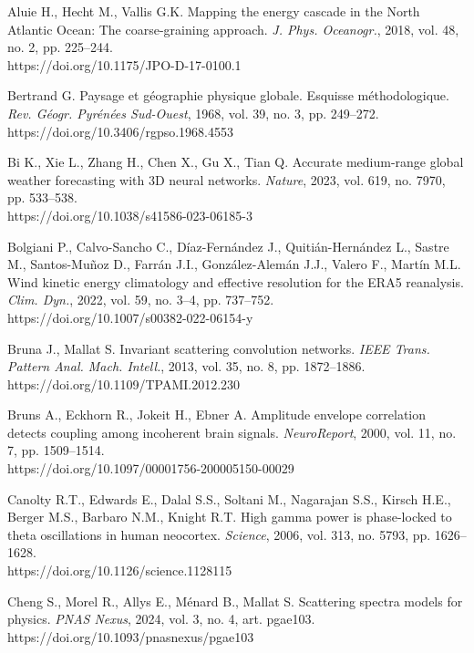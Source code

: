 \documentclass[12pt,a4paper]{article}
\begin{document}
\noindent Aluie H., Hecht M., Vallis G.K. Mapping the energy cascade in the North Atlantic Ocean: The coarse-graining approach. \textit{J. Phys. Oceanogr.}, 2018, vol. 48, no. 2, pp. 225–244.\\ https://doi.org/10.1175/JPO-D-17-0100.1

\noindent Bertrand G. Paysage et géographie physique globale. Esquisse méthodologique. \textit{Rev. Géogr. Pyrénées Sud-Ouest}, 1968, vol. 39, no. 3, pp. 249–272.\\ https://doi.org/10.3406/rgpso.1968.4553

\noindent Bi K., Xie L., Zhang H., Chen X., Gu X., Tian Q. Accurate medium-range global weather forecasting with 3D neural networks. \textit{Nature}, 2023, vol. 619, no. 7970, pp. 533–538.\\ https://doi.org/10.1038/s41586-023-06185-3

\noindent Bolgiani P., Calvo-Sancho C., Díaz-Fernández J., Quitián-Hernández L., Sastre M., Santos-Muñoz D., Farrán J.I., González-Alemán J.J., Valero F., Martín M.L. Wind kinetic energy climatology and effective resolution for the ERA5 reanalysis. \textit{Clim. Dyn.}, 2022, vol. 59, no. 3–4, pp. 737–752.\\ https://doi.org/10.1007/s00382-022-06154-y

\noindent Bruna J., Mallat S. Invariant scattering convolution networks. \textit{IEEE Trans. Pattern Anal. Mach. Intell.}, 2013, vol. 35, no. 8, pp. 1872–1886.\\ https://doi.org/10.1109/TPAMI.2012.230

\noindent Bruns A., Eckhorn R., Jokeit H., Ebner A. Amplitude envelope correlation detects coupling among incoherent brain signals. \textit{NeuroReport}, 2000, vol. 11, no. 7, pp. 1509–1514.\\ https://doi.org/10.1097/00001756-200005150-00029

\noindent Canolty R.T., Edwards E., Dalal S.S., Soltani M., Nagarajan S.S., Kirsch H.E., Berger M.S., Barbaro N.M., Knight R.T. High gamma power is phase-locked to theta oscillations in human neocortex. \textit{Science}, 2006, vol. 313, no. 5793, pp. 1626–1628.\\ https://doi.org/10.1126/science.1128115

\noindent Cheng S., Morel R., Allys E., Ménard B., Mallat S. Scattering spectra models for physics. \textit{PNAS Nexus}, 2024, vol. 3, no. 4, art. pgae103.\\ https://doi.org/10.1093/pnasnexus/pgae103
\end{document}
